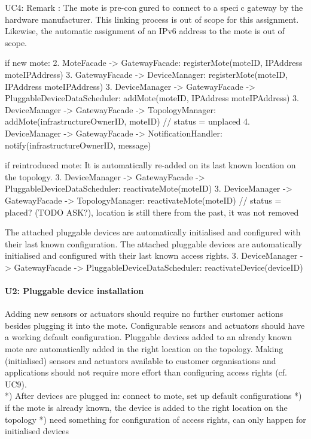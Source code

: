         UC4:
            Remark : The mote is pre-congured to connect to a specic gateway by
             the hardware manufacturer. This linking process is out of scope for
             this assignment. Likewise, the automatic assignment of an IPv6 address
             to the mote is out of scope.

            if new mote:
                2. MoteFacade -> GatewayFacade: registerMote(moteID, IPAddress moteIPAddress)
                3. GatewayFacade -> DeviceManager: registerMote(moteID, IPAddress moteIPAddress)
                3. DeviceManager -> GatewayFacade -> PluggableDeviceDataScheduler: addMote(moteID, IPAddress moteIPAddress)
                3. DeviceManager -> GatewayFacade -> TopologyManager: addMote(infrastructureOwnerID, moteID) // status = unplaced
                4. DeviceManager -> GatewayFacade -> NotificationHandler: notify(infrastructureOwnerID, message)

        if reintroduced mote:
            It is automatically re-added on its last known location on the topology.
                3. DeviceManager -> GatewayFacade -> PluggableDeviceDataScheduler: reactivateMote(moteID)
                3. DeviceManager -> GatewayFacade -> TopologyManager: reactivateMote(moteID) // status = placed? (TODO ASK?), location is still there from the past, it was not removed

            The attached pluggable devices are automatically initialised and configured with their last known configuration.
            The attached pluggable devices are automatically initialised and configured with their last known access rights.
                3. DeviceManager -> GatewayFacade -> PluggableDeviceDataScheduler: reactivateDevice(deviceID)


    \paragraph{U2: Pluggable device installation}
        Adding new sensors or actuators should require no further customer
        actions besides plugging it into the mote. Configurable sensors and
        actuators should have a working default configuration.
        Pluggable devices added to an already known mote are automatically
        added in the right location on the topology.
        Making (initialised) sensors and actuators available to customer
        organisations and applications should not require more effort than
        configuring access rights (cf. UC9). \\
        *) After devices are plugged in: connect to mote, set up default configurations
        *) if the mote is already known, the device is added to the right location on the topology
        *) need something for configuration of access rights, can only happen for initialised devices

